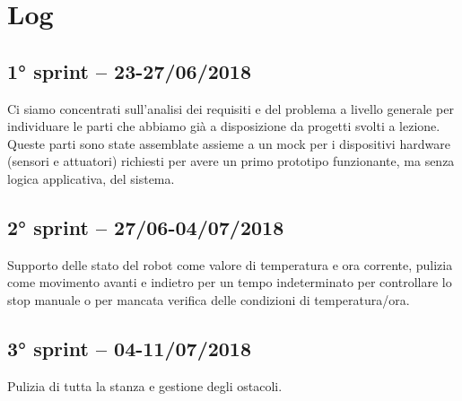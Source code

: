 \section{Log}

\subsection{1° sprint -- 23-27/06/2018}
Ci siamo concentrati sull'analisi dei requisiti e del problema a livello generale per individuare le parti che abbiamo già a disposizione da progetti svolti a lezione. Queste parti sono state assemblate assieme a un mock per i dispositivi hardware (sensori e attuatori) richiesti per avere un primo prototipo funzionante, ma senza logica applicativa, del sistema.

\subsection{2° sprint -- 27/06-04/07/2018}
Supporto delle stato del robot come valore di temperatura e ora corrente, pulizia come movimento avanti e indietro per un tempo indeterminato per controllare lo stop manuale o per mancata verifica delle condizioni di temperatura/ora.

\subsection{3° sprint -- 04-11/07/2018}
Pulizia di tutta la stanza e gestione degli ostacoli.


